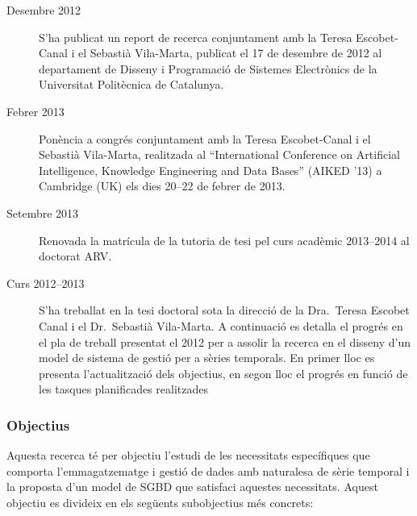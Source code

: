 \begin{description}


\item[Desembre 2012] S'ha publicat un report de
  recerca \parencite{llusa12:report} conjuntament amb la Teresa
  Escobet-Canal i el Sebastià Vila-Marta, publicat el 17 de desembre
  de 2012 al departament de Disseny i Programació de Sistemes
  Electrònics de la Universitat Politècnica de Catalunya.


\item[Febrer 2013] Ponència a congrés \parencite{llusa13:aiked}
  conjuntament amb la Teresa Escobet-Canal i el Sebastià Vila-Marta,
  realitzada al ``International Conference on Artificial Intelligence,
  Knowledge Engineering and Data Bases'' (AIKED '13) a Cambridge (UK)
  els dies 20--22 de febrer de 2013.  


\item[Setembre 2013] Renovada la matrícula de la tutoria de tesi pel
  curs acadèmic 2013--2014 al doctorat ARV.




\item[Curs 2012--2013] S'ha treballat en la tesi doctoral sota la
  direcció de la Dra.\ Teresa Escobet Canal i el Dr.\ Sebastià
  Vila-Marta. A continuació es detalla el progrés en el pla de treball
  presentat el 2012 per a assolir la recerca en el disseny d'un model
  de sistema de gestió per a sèries temporals. En primer lloc es
  presenta l'actualització dels objectius, en segon lloc el progrés en
  funció de les tasques planificades realitzades


\end{description}



\subsubsection*{Objectius}


Aquesta recerca té per objectiu l'estudi de les necessitats
específiques que comporta l'emmagatzematge i gestió de dades amb
naturalesa de sèrie temporal i la proposta d'un model de SGBD que
satisfaci aquestes necessitats. Aquest objectiu es divideix en els
següents subobjectius més concrets:

